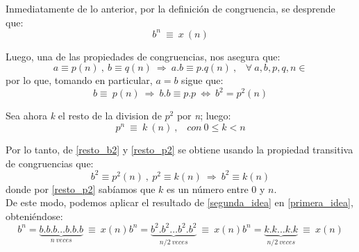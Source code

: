 	Inmediatamente de lo anterior, por la definición de congruencia, se desprende que:
	\begin{equation}
		b^n\ \equiv\ x\ (n)
	\label{primera_idea}
	\end{equation}

	Luego, una de las propiedades de congruencias, nos asegura que:
	\begin{equation}
		a \equiv p (n)\ ,\ b \equiv q (n)\ \Longrightarrow\ a.b \equiv p.q (n)\ , \hspace{10pt} \forall\ a,b,p,q,n \in
	\end{equation}
por lo que, tomando en particular, $a=b$ sigue que:
	\begin{equation}
		b \equiv\ p (n)\ \Longrightarrow\ b.b \equiv p.p\  \Leftrightarrow\ b^2 = p^2 (n)
	\label{resto_b2}
	\end{equation}

	Sea ahora \textit{k} el resto de la division de $ p^2 $ por \textit{n}; luego:
	\begin{equation}
		p^n\ \equiv\ k\ (n)\ , \hspace{10pt} con\ 0 \leq k < n
	\label{resto_p2}
	\end{equation}

	Por lo tanto, de \ref{resto_b2} y \ref{resto_p2} se obtiene usando la propiedad transitiva de congruencias que:
	\begin{equation}
		b^2 \equiv p^2 (n)\ ,\ p^2 \equiv k (n)\ \Longrightarrow\ b^2 \equiv k (n)
	\label{segunda_idea}
	\end{equation}
donde por \ref{resto_p2} sabíamos que $k$ es un número entre 0 y $n$.\\

	De este modo, podemos aplicar el resultado de \ref{segunda_idea} en \ref{primera_idea}, obteniéndose:
	\begin{equation}
		b^n = \underbrace{b.b.b \hdots b.b.b}_{n\ veces}\ \equiv\ x (n) 
		b^n = \underbrace{b^2. b^2 \hdots b^2. b^2}_{n/2\ veces}\ \equiv\ x (n)
		b^n = \underbrace{k. k \hdots k. k}_{n/2\ veces}\ \equiv\ x (n)
	\label{idea_final}
	\end{equation}
	

